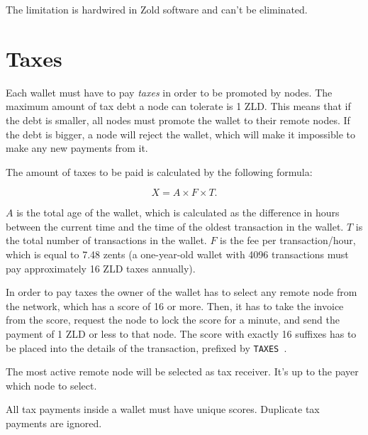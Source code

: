\documentclass[11pt,oneside]{article}
\newcommand\dd[1]{\colorbox{gray!30}{\texttt{#1}}}
\begin{document}
The limitation is hardwired in Zold software and can't be eliminated.

\section{Taxes}

Each wallet must have to pay \emph{taxes} in order to be promoted by nodes.
The maximum amount of tax debt a node can tolerate is 1 ZLD. This means
that if the debt is smaller, all nodes must promote the wallet to their
remote nodes. If the debt is bigger, a node will reject the wallet,
which will make it impossible to make any new payments from it.

The amount of taxes to be paid is calculated by the following formula:

$$X = A \times F \times T.$$

$A$ is the total age of the wallet,
which is calculated as the difference in hours between the current time
and the time of the oldest transaction in the wallet.
$T$ is the total number of transactions in the wallet.
$F$ is the fee per transaction/hour, which is equal to 7.48 zents
(a one-year-old wallet with 4096 transactions must pay approximately 16 ZLD taxes annually).

In order to pay taxes the owner of the wallet has to select any remote
node from the network, which has a score of 16 or more. Then, it has to
take the invoice from the score, request the node to lock the score
for a minute, and send the payment of 1 ZLD or less
to that node. The score with exactly 16 suffixes
has to be placed into the details of the transaction,
prefixed by \dd{TAXES }.

The most active remote node will be selected as tax receiver.
It's up to the payer which node to select.

All tax payments inside a wallet must have unique scores.
Duplicate tax payments are ignored.

\end{document}
